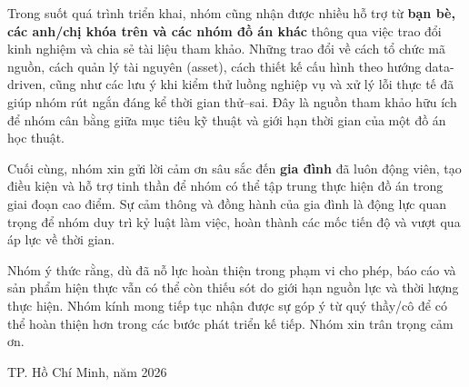 Trong suốt quá trình triển khai, nhóm cũng nhận được nhiều hỗ trợ từ \textbf{bạn bè, các anh/chị khóa trên và các nhóm đồ án khác} thông qua việc trao đổi kinh nghiệm và chia sẻ tài liệu tham khảo. Những trao đổi về cách tổ chức mã nguồn, cách quản lý tài nguyên (asset), cách thiết kế cấu hình theo hướng data-driven, cũng như các lưu ý khi kiểm thử luồng nghiệp vụ và xử lý lỗi thực tế đã giúp nhóm rút ngắn đáng kể thời gian thử--sai. Đây là nguồn tham khảo hữu ích để nhóm cân bằng giữa mục tiêu kỹ thuật và giới hạn thời gian của một đồ án học thuật.

Cuối cùng, nhóm xin gửi lời cảm ơn sâu sắc đến \textbf{gia đình} đã luôn động viên, tạo điều kiện và hỗ trợ tinh thần để nhóm có thể tập trung thực hiện đồ án trong giai đoạn cao điểm. Sự cảm thông và đồng hành của gia đình là động lực quan trọng để nhóm duy trì kỷ luật làm việc, hoàn thành các mốc tiến độ và vượt qua áp lực về thời gian.

Nhóm ý thức rằng, dù đã nỗ lực hoàn thiện trong phạm vi cho phép, báo cáo và sản phẩm hiện thực vẫn có thể còn thiếu sót do giới hạn nguồn lực và thời lượng thực hiện. Nhóm kính mong tiếp tục nhận được sự góp ý từ quý thầy/cô để có thể hoàn thiện hơn trong các bước phát triển kế tiếp. Nhóm xin trân trọng cảm ơn.

\vspace{0.8cm}
\begin{flushright}
TP. Hồ Chí Minh, năm 2026
\end{flushright}
